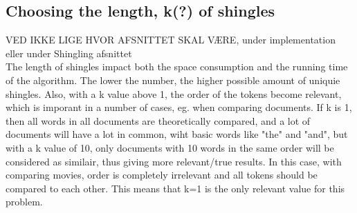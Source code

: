\subsection{Choosing the length, k(?) of shingles}
VED IKKE LIGE HVOR AFSNITTET SKAL VÆRE, under implementation eller under Shingling afsnittet\\
The length of shingles impact both the space consumption and the running time of the algorithm. The lower the number, the higher possible amount of uniquie shingles. Also, with a k value above 1, the order of the tokens become relevant, which is imporant in a number of cases, eg. when comparing documents. If k is 1, then all words in all documents are theoretically compared, and a lot of documents will have a lot in common, wiht basic words like "the" and "and", but with a k value of 10, only documents with 10 words in the same order will be considered as similair, thus giving more relevant/true results. In this case, with comparing movies, order is completely irrelevant and all tokens should be compared to each other. This means that k=1 is the only relevant value for this problem.